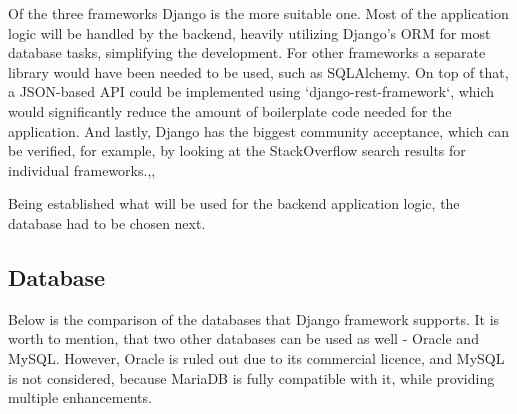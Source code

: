 Of the three frameworks Django is the more suitable one.
Most of the application logic will be handled by the backend, heavily utilizing
Django's ORM for most database tasks, simplifying the development. For other frameworks a separate library would
have been needed to be used, such as SQLAlchemy\cite{sqlalchemy}.
On top of that, a JSON-based API could be implemented using `django-rest-framework`,
which would significantly reduce the amount of boilerplate code needed for the application.
And lastly, Django has the biggest community acceptance, which can be verified, for example, by looking at the
StackOverflow\cite{stackoverflow} search results for individual frameworks.\cite{so_fastapi},\cite{so_django},\cite{so_flask}

Being established what will be used for the backend application logic, the database had to be chosen next.

\subsection{Database}
Below is the comparison of the databases that Django framework supports.
It is worth to mention, that two other databases can be used as well - Oracle and MySQL.
However, Oracle is ruled out due to its commercial licence, and MySQL is not considered, because
MariaDB is fully compatible with it, while providing multiple enhancements.


